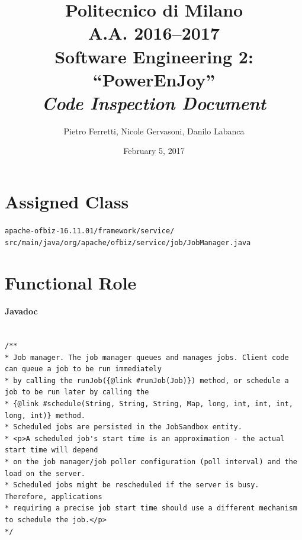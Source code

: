 \documentclass[english]{article}
\begin{document}
\title{Politecnico di Milano\\
 A.A. 2016–2017 \\
Software Engineering 2: “PowerEnJoy” \\
\emph{Code Inspection Document}}

\author{Pietro Ferretti, Nicole Gervasoni, Danilo Labanca}
\date{February 5, 2017}
\maketitle

\newpage

\tableofcontents{}

\newpage

\section{Assigned Class}

\texttt{apache-ofbiz-16.11.01/framework/service/\\
\hspace*{1cm}src/main/java/org/apache/ofbiz/service/job/JobManager.java}

\section{Functional Role}%

\paragraph{Javadoc}

\begin{lstlisting}

/**
* Job manager. The job manager queues and manages jobs. Client code can queue a job to be run immediately
* by calling the runJob({@link #runJob(Job)}) method, or schedule a job to be run later by calling the
* {@link #schedule(String, String, String, Map, long, int, int, int, long, int)} method.
* Scheduled jobs are persisted in the JobSandbox entity.
* <p>A scheduled job's start time is an approximation - the actual start time will depend
* on the job manager/job poller configuration (poll interval) and the load on the server.
* Scheduled jobs might be rescheduled if the server is busy. Therefore, applications
* requiring a precise job start time should use a different mechanism to schedule the job.</p>
*/
\end{lstlisting}
\end{document}

